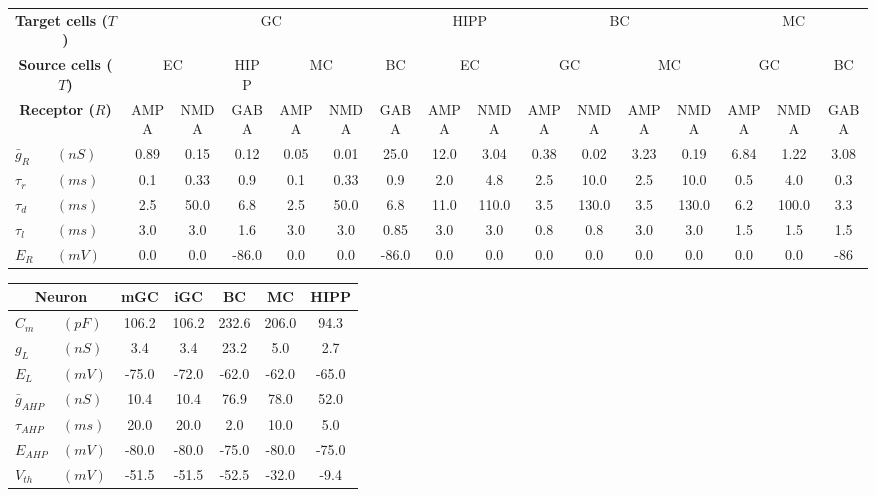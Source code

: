 \documentclass{article}
\begin{document}
\begin{center}


\begin{table}[h!]
\centering
\renewcommand{\arraystretch}{1.4}
\begin{tabular}{llccccccccccccccc}
\toprule
\multicolumn{2}{c}{\textbf{Target cells ($T$)}} & \multicolumn{6}{c}{GC} & \multicolumn{2}{c}{HIPP} & \multicolumn{4}{c}{BC} & \multicolumn{3}{c}{MC}  \\
\cline{3-8}
\cline{11-14}
\multicolumn{2}{c}{\textbf{Source cells ($T$)}} & \multicolumn{2}{c}{EC} & \multicolumn{1}{c}{HIPP} & \multicolumn{2}{c}{MC} & \multicolumn{1}{c}{BC} & \multicolumn{2}{c}{EC} & \multicolumn{2}{c}{GC} & \multicolumn{2}{c}{MC} & \multicolumn{2}{c}{GC} & \multicolumn{1}{c}{BC}  \\
\cline{3-4}
\cline{6-7}
\cline{9-10}
\cline{13-14}
\cline{17-17}
\multicolumn{2}{c}{\textbf{Receptor ($R$)}} & AMPA & NMDA & GABA & AMPA & NMDA & GABA & AMPA & NMDA & AMPA & NMDA & AMPA & NMDA & AMPA & NMDA & GABA\\
\midrule
$\bar{g}_R$ & $(nS)$ & 0.89 & 0.15 & 0.12 & 0.05 & 0.01 & 25.0 & 12.0 & 3.04 & 0.38 & 0.02 & 3.23 & 0.19& 6.84 & 1.22 & 3.08\\
$\tau_{r}$ & $(ms)$ & 0.1 & 0.33 & 0.9 & 0.1 & 0.33 & 0.9 & 2.0 &4.8  & 2.5& 10.0 &2.5& 10.0 & 0.5& 4.0 & 0.3\\
$\tau_{d}$ & $(ms)$ & 2.5 & 50.0 & 6.8 & 2.5 & 50.0 & 6.8 & 11.0& 110.0 & 3.5 &130.0 &3.5& 130.0 &6.2 &100.0 & 3.3\\
$\tau_{l}$ & $(ms)$ & 3.0 & 3.0 & 1.6 & 3.0 & 3.0 & 0.85 & 3.0& 3.0 & 0.8 &0.8 &3.0 &3.0 &1.5& 1.5 & 1.5\\
$E_R$      & $(mV)$     & 0.0 & 0.0 & -86.0 & 0.0 & 0.0 & -86.0 & 0.0 & 0.0 & 0.0 & 0.0 & 0.0 & 0.0 & 0.0 & 0.0 & -86\\
\bottomrule
\end{tabular}
\end{table}


\begin{table}[h!]
\centering
\renewcommand{\arraystretch}{1.4}
\begin{tabular}{llccccc}
\toprule
\multicolumn{2}{c}{\textbf{Neuron}} & mGC & iGC & BC & MC & HIPP \\
\midrule
$C_m$ & $(pF)$ &106.2&106.2 & 232.6 & 206.0 & 94.3\\
$g_{L}$ & $(nS)$ & 3.4& 3.4 & 23.2 & 5.0 & 2.7 \\
$E_{L}$ & $(mV)$ & -75.0& -72.0  &-62.0 & -62.0 & -65.0 \\
$\bar{g}_{AHP}$ & $(nS)$ & 10.4& 10.4 & 76.9 & 78.0 & 52.0  \\
$\tau_{AHP}$ & $(ms)$ & 20.0& 20.0  &2.0 & 10.0 & 5.0  \\
$E_{AHP}$ & $(mV)$ & -80.0& -80.0 & -75.0 & -80.0  &-75.0 \\
$V_{th}$ & $(mV)$ & -51.5& -51.5 & -52.5 & -32.0 & -9.4  \\
\bottomrule
\end{tabular}
\end{table}

\end{center}
\end{document}

